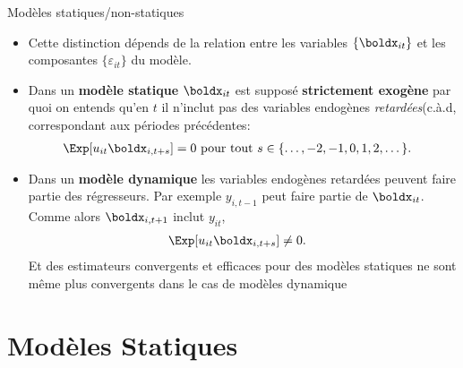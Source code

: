         \begin{frame}[allowframebreaks]{Modèles statiques/non-statiques}
            \begin{itemize}
            \item Cette distinction dépends de la relation entre les variables $\{\bold\boldx_{it}\}$ et 
            les composantes $\{\varepsilon_{it}\}$ du modèle. 
            \item Dans un \textbf{modèle statique} $\bold\boldx_{it}$ est supposé \textbf{strictement exogène} par quoi 
            on entends qu'en $t$ il n'inclut pas des variables endogènes \emph{retardées}(c.à.d, correspondant aux périodes précédentes:
            \begin{align*}
                \Exp[u_{it}\boldx_{i, t+ s}]&=0 \ \text{pour tout} \ s\in\{\ldots, -2, -1, 0, 1, 2, \dots\}.
            \end{align*}
            \item Dans un \textbf{modèle dynamique} les variables endogènes retardées peuvent faire partie 
            des régresseurs. Par exemple $y_{i, t-1}$ peut faire partie de $\bold\boldx_{it}$. Comme alors 
            $\boldx_{i, t+1}$ inclut $y_{it}$,
            \begin{align*}
                \Exp[u_{it}\boldx_{i, t+s}]&\neq 0.
            \end{align*}
            Et des estimateurs convergents et efficaces pour des modèles statiques 
            ne sont même plus convergents dans le cas de modèles dynamique
\end{itemize}
\end{frame}

\section{Modèles Statiques}
\frame{\sectionpage}

